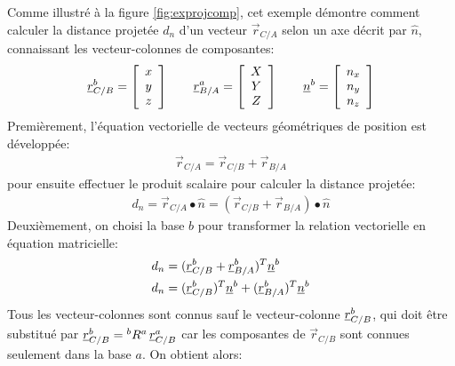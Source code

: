 \begin{example}
%
Comme illustré à la figure \ref{fig:exprojcomp}, cet exemple démontre comment calculer la distance projetée $d_n$ d'un vecteur $\vec{r}_{C/A}$ selon un axe décrit par $\hat{n}$, connaissant les vecteur-colonnes de composantes:
\begin{align}
\underline{r}_{C/B}^b = \left[ \begin{array}{c} x \\ y \\ z  \end{array} \right]
\quad\quad
\underline{r}_{B/A}^a = \left[ \begin{array}{c} X \\ Y \\ Z  \end{array} \right]
\quad\quad
\underline{n}^b       = \left[ \begin{array}{c} n_x \\ n_y \\ n_z  \end{array} \right]
\label{eq:disprojexdef}
\end{align} 
Premièrement, l'équation vectorielle de vecteurs géométriques de position est développée:
\begin{align}
\vec{r}_{C/A} = \vec{r}_{C/B} + \vec{r}_{B/A}
\end{align} 
pour ensuite effectuer le produit scalaire pour calculer la distance projetée:
\begin{align}
d_n = \vec{r}_{C/A} \bullet \hat{n} = (\vec{r}_{C/B} + \vec{r}_{B/A} ) \bullet \hat{n} 
\end{align} 
Deuxièmement, on choisi la base $b$ pour transformer la relation vectorielle en équation matricielle:
\begin{align}
d_n &= (\underline{r}_{C/B}^b + \underline{r}_{B/A}^b )^T \underline{n}^b \\
d_n &= ( \underline{r}_{C/B}^b )^T \underline{n}^b + ( \underline{r}_{B/A}^b )^T \underline{n}^b
\end{align} 
Tous les vecteur-colonnes sont connus sauf le vecteur-colonne $\underline{r}_{C/B}^b$, qui doit être substitué par $\underline{r}_{C/B}^b = {}^bR^a \, \underline{r}_{C/B}^a$ car les composantes de $\vec{r}_{C/B}$ sont connues seulement dans la base $a$. On obtient alors:

\end{example}
